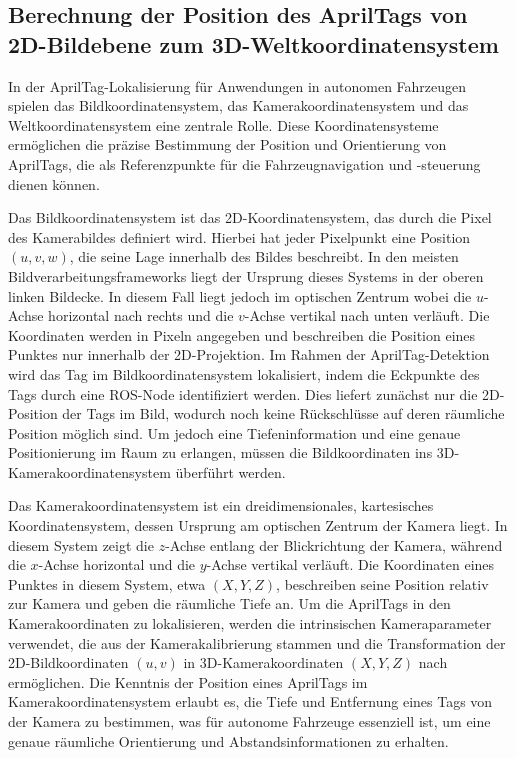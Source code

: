 \documentclass[ngerman]{article}    %
\theoremstyle{definition}
\begin{document}
\subsection{Berechnung der Position des AprilTags von 2D-Bildebene zum 3D-Weltkoordinatensystem}

In der AprilTag-Lokalisierung für Anwendungen in autonomen Fahrzeugen spielen das Bildkoordinatensystem, das Kamerakoordinatensystem und das Weltkoordinatensystem eine zentrale Rolle. Diese Koordinatensysteme ermöglichen die präzise Bestimmung der Position und Orientierung von AprilTags, die als Referenzpunkte für die Fahrzeugnavigation und -steuerung dienen können.


Das Bildkoordinatensystem ist das 2D-Koordinatensystem, das durch die Pixel des Kamerabildes definiert wird. Hierbei hat jeder Pixelpunkt eine Position \((u, v, w)\), die seine Lage innerhalb des Bildes beschreibt. In den meisten Bildverarbeitungsframeworks liegt der Ursprung dieses Systems in der oberen linken Bildecke. In diesem Fall liegt jedoch im optischen Zentrum wobei die \( u \)-Achse horizontal nach rechts und die \( v \)-Achse vertikal nach unten verläuft. Die Koordinaten werden in Pixeln angegeben und beschreiben die Position eines Punktes nur innerhalb der 2D-Projektion. Im Rahmen der AprilTag-Detektion wird das Tag im Bildkoordinatensystem lokalisiert, indem die Eckpunkte des Tags durch eine ROS-Node identifiziert werden. Dies liefert zunächst nur die 2D-Position der Tags im Bild, wodurch noch keine Rückschlüsse auf deren räumliche Position möglich sind. Um jedoch eine Tiefeninformation und eine genaue Positionierung im Raum zu erlangen, müssen die Bildkoordinaten ins 3D-Kamerakoordinatensystem überführt werden.


Das Kamerakoordinatensystem ist ein dreidimensionales, kartesisches Koordinatensystem, dessen Ursprung am optischen Zentrum der Kamera liegt. In diesem System zeigt die \( z \)-Achse entlang der Blickrichtung der Kamera, während die \( x \)-Achse horizontal und die \( y \)-Achse vertikal verläuft. Die Koordinaten eines Punktes in diesem System, etwa \( (X, Y, Z) \), beschreiben seine Position relativ zur Kamera und geben die räumliche Tiefe an. Um die AprilTags in den Kamerakoordinaten zu lokalisieren, werden die intrinsischen Kameraparameter verwendet, die aus der Kamerakalibrierung stammen und die Transformation der 2D-Bildkoordinaten \((u, v)\) in 3D-Kamerakoordinaten \((X, Y, Z)\) nach \cite{Wang} ermöglichen. Die Kenntnis der Position eines AprilTags im Kamerakoordinatensystem erlaubt es, die Tiefe und Entfernung eines Tags von der Kamera zu bestimmen, was für autonome Fahrzeuge essenziell ist, um eine genaue räumliche Orientierung und Abstandsinformationen zu erhalten.
\end{document}
